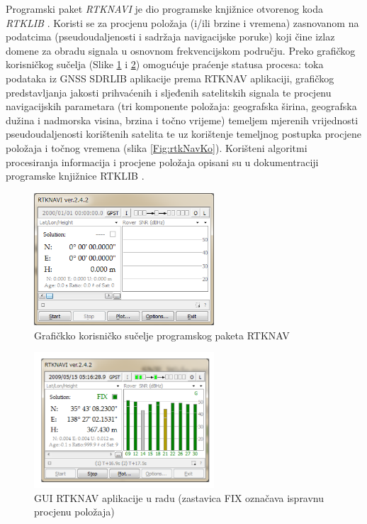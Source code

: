 \documentclass[a4paper,twoside,12pt]{memoir} %
\begin{document}
%
Programski paket \textit{RTKNAVI} je dio programske knjižnice otvorenog koda \textit{RTKLIB} \cite{ref:36, ref:5}.
Koristi se za procjenu položaja (i/ili brzine i vremena) zasnovanom na podatcima
(pseudoudaljenosti i sadržaja navigacijske poruke) koji čine izlaz domene za obradu signala u osnovnom
frekvencijskom području. Preko grafičkog korisničkog sučelja (Slike \ref{Fig:rtkNav} i \ref{Fig:guirtkNav}) omogućuje
praćenje statusa procesa: toka podataka iz GNSS SDRLIB aplikacije prema RTKNAV aplikaciji,
grafičkog predstavljanja jakosti prihvaćenih i sljeđenih satelitskih signala te procjenu navigacijskih
parametara (tri komponente položaja: geografska širina, geografska dužina i nadmorska visina,
brzina i točno vrijeme) temeljem mjerenih vrijednosti pseudoudaljenosti korištenih
satelita te uz korištenje temeljnog postupka procjene položaja i točnog
vremena (slika \ref{Fig:rtkNavKo}). 
Korišteni algoritmi procesiranja informacija i procjene
položaja opisani su u dokumentraciji programske knjižnice RTKLIB \cite{ref:36}.
\begin{figure}[H]
	\centering
	\includegraphics[width=0.6\textwidth]{rtkNav}
	\caption{Grafičkko korisničko sučelje programskog paketa RTKNAV}
	\label{Fig:rtkNav}	
\end{figure}
\begin{figure}[H]
	\centering
	\includegraphics[width=0.6\textwidth]{guirtkNav}
	\caption{GUI RTKNAV aplikacije u radu (zastavica FIX označava ispravnu procjenu položaja)}
	\label{Fig:guirtkNav}	
\end{figure}
\end{document}
